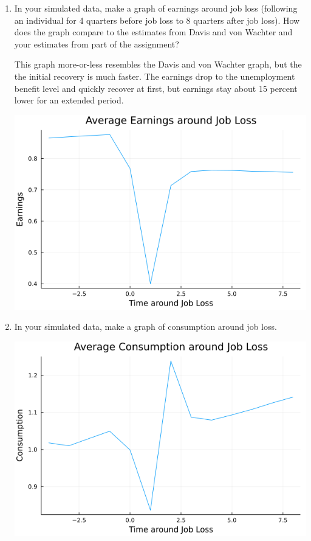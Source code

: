 \documentclass{article}
\begin{document}
\begin{enumerate}
\begin{enumerate}
\bigskip

\item In your simulated data, make a graph of earnings around job loss (following an individual for 4 quarters before job loss to 8 quarters after job loss). How does the graph compare to the estimates from Davis and von Wachter and your estimates from part of the assignment?

\bigskip

This graph more-or-less resembles the Davis and von Wachter graph, but the the initial recovery is much faster.  The earnings drop to the unemployment benefit level and quickly recover at first, but earnings stay about 15 percent lower for an extended period.

\begin{center}
\includegraphics[scale = 0.5]{figure_3f}
\end{center}

\pagebreak

\item In your simulated data, make a graph of consumption around job loss.

\begin{center}
\includegraphics[scale = 0.5]{figure_3g}
\end{center}


\end{enumerate}
\end{enumerate}
\end{document}
